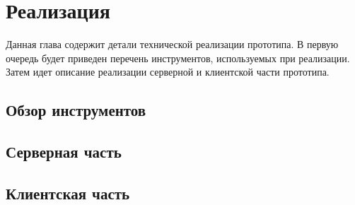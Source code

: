 ﻿\section{Реализация}

Данная глава содержит  детали технической реализации прототипа.
В первую очередь будет приведен перечень инструментов,
используемых при реализации.
Затем идет описание реализации серверной и клиентской части прототипа.

\subsection{Обзор инструментов}
\lipsum[4]

\subsection{Серверная часть}
\lipsum[5]

\subsection{Клиентская часть}
\lipsum[6]